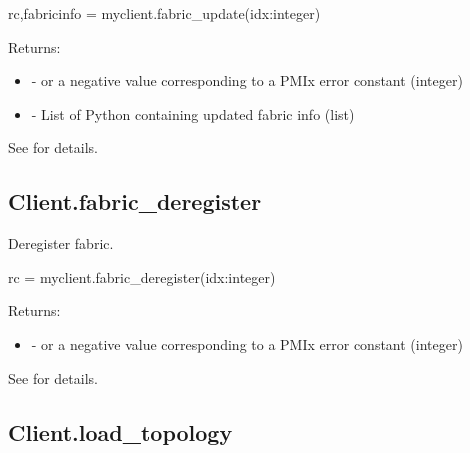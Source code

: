 \format

\pyspecificstart
\begin{codepar}
rc,fabricinfo = myclient.fabric_update(idx:integer)
\end{codepar}
\pyspecificend


\begin{arglist}
\end{arglist}

Returns:

\begin{itemize}
    \item {} -  or a negative value corresponding to a PMIx error constant (integer)
    \item {} - List of Python  containing updated fabric info (list)
\end{itemize}

See  for details.


\subsection{Client.fabric_deregister}

\summary
Deregister fabric.

\format

\pyspecificstart
\begin{codepar}
rc = myclient.fabric_deregister(idx:integer)
\end{codepar}
\pyspecificend


\begin{arglist}
\end{arglist}

Returns:

\begin{itemize}
    \item {} -  or a negative value corresponding to a PMIx error constant (integer)
\end{itemize}

See  for details.


\subsection{Client.load_topology}

